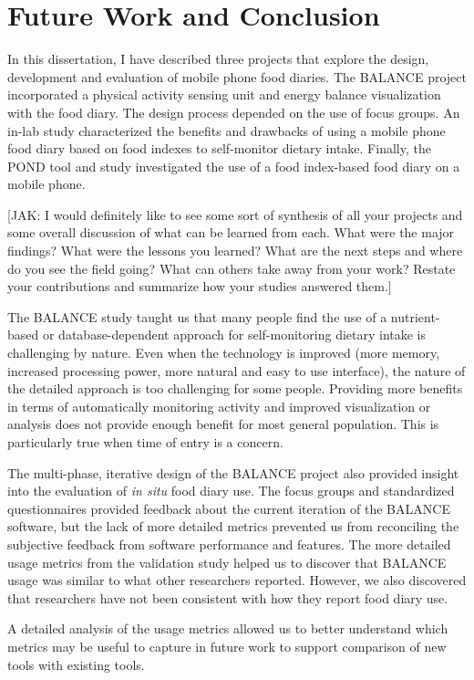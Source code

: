 \chapter{Future Work and Conclusion}
\label{cha:futureWork}
In this dissertation, I have described three projects that explore the design,  development and evaluation of mobile phone food diaries. The BALANCE project incorporated a physical activity sensing unit and energy balance visualization with the food diary. The design process depended on the use of focus groups. An in-lab study characterized the benefits and drawbacks of using a mobile phone food diary based on food indexes to self-monitor dietary intake. Finally, the POND tool and study investigated the use of a food index-based food diary on a mobile phone. 

[JAK: I would definitely like to see some sort of synthesis of all your projects and some overall discussion of what can be learned from each. What were the major findings? What were the lessons you learned? What are the next steps and where do you see the field going? What can others take away from your work? Restate your contributions and summarize how your studies answered them.] 

The BALANCE study taught us that many people find the use of a nutrient-based or database-dependent approach for self-monitoring dietary intake is challenging by nature. Even when the technology is improved (more memory, increased processing power, more natural and easy to use interface), the nature of the detailed approach is too challenging for some people. Providing more benefits in terms of automatically monitoring activity and improved visualization or analysis does not provide enough benefit for most general population. This is particularly true when time of entry is a concern. 

The multi-phase, iterative design of the BALANCE project also provided insight into the evaluation of \textit{in situ} food diary use. The focus groups and standardized questionnaires provided feedback about the current iteration of the BALANCE software, but the lack of more detailed metrics prevented us from reconciling the subjective feedback from software performance and features. The more detailed usage metrics from the validation study helped us to discover that BALANCE usage was similar to what other researchers reported. However, we also discovered that researchers have not been consistent with how they report food diary use. 


A detailed analysis of the usage metrics allowed us to better understand which metrics may be useful to capture in future work to support comparison of new tools with existing tools. 


